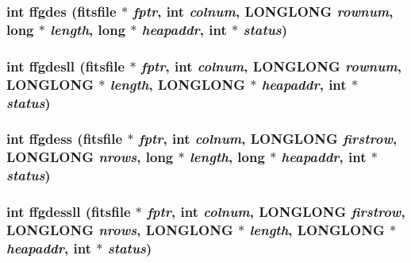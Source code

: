 \subsubsection{\setlength{\rightskip}{0pt plus 5cm}int ffgdes (\bf{fitsfile} $\ast$ {\em fptr}, int {\em colnum}, \bf{LONGLONG} {\em rownum}, long $\ast$ {\em length}, long $\ast$ {\em heapaddr}, int $\ast$ {\em status})}\label{test_2shm__client_2fitsio_8h_c66d84a807557a2d7aa8f1a3b3012100}


\subsubsection{\setlength{\rightskip}{0pt plus 5cm}int ffgdesll (\bf{fitsfile} $\ast$ {\em fptr}, int {\em colnum}, \bf{LONGLONG} {\em rownum}, \bf{LONGLONG} $\ast$ {\em length}, \bf{LONGLONG} $\ast$ {\em heapaddr}, int $\ast$ {\em status})}\label{test_2shm__client_2fitsio_8h_3d39c62a134b069e27cc44a8a51f8536}


\subsubsection{\setlength{\rightskip}{0pt plus 5cm}int ffgdess (\bf{fitsfile} $\ast$ {\em fptr}, int {\em colnum}, \bf{LONGLONG} {\em firstrow}, \bf{LONGLONG} {\em nrows}, long $\ast$ {\em length}, long $\ast$ {\em heapaddr}, int $\ast$ {\em status})}\label{test_2shm__client_2fitsio_8h_7d0b7c25bc1bd32b8f115343aa4abb93}


\subsubsection{\setlength{\rightskip}{0pt plus 5cm}int ffgdessll (\bf{fitsfile} $\ast$ {\em fptr}, int {\em colnum}, \bf{LONGLONG} {\em firstrow}, \bf{LONGLONG} {\em nrows}, \bf{LONGLONG} $\ast$ {\em length}, \bf{LONGLONG} $\ast$ {\em heapaddr}, int $\ast$ {\em status})}\label{test_2shm__client_2fitsio_8h_9d2a8b64f329ddcc261edfacabb4861f}


